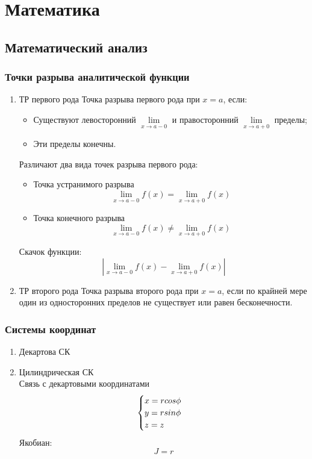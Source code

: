 \section{Математика}




\subsection{Математический анализ}
\subsubsection{Точки разрыва аналитической функции}
\begin{enumerate}
    \item ТР первого рода
Точка разрыва первого рода при $x=a$, если:
\begin{itemize}
    \item Существуют левосторонний $\lim\limits_{x\to a-0}$ и правосторонний $\lim\limits_{x\to a+0}$ пределы;
    \item Эти пределы конечны.
\end{itemize}
Различают два вида точек разрыва первого рода:
\begin{itemize}
    \item Точка устранимого разрыва
    $$\lim\limits_{x\to a-0}f(x) = \lim\limits_{x\to a+0}f(x)$$
    \item Точка конечного разрыва
    $$\lim\limits_{x\to a-0}f(x)\neq \lim\limits_{x\to a+0}f(x)$$
\end{itemize}
Скачок функции:
$$\left|\lim\limits_{x\to a-0}f(x) - \lim\limits_{x\to a+0}f(x)\right|$$
\item ТР второго рода
Точка разрыва второго рода при $x=a$, если по крайней мере один из односторонних пределов не существует или равен бесконечности.
\end{enumerate}

\subsubsection{Системы координат}
\begin{enumerate}
    \item Декартова СК
    \item Цилиндрическая СК\\
      Связь с декартовыми координатами
      \begin{equation*}
        \begin{cases}
          $$x=rcos\phi$$\\
          $$y=rsin\phi$$\\
          $$z=z$$
        \end{cases}
      \end{equation*}
      Якобиан: $$J=r$$
\end{enumerate}



